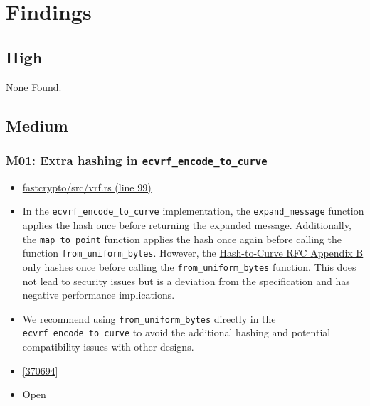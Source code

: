\section{Findings}
\subsection{High}
    None Found.
\subsection{Medium}

\subsubsection*{M01: Extra hashing in \lstinline{ecvrf_encode_to_curve}}
\begin{itemize}[align=left]
    \item[\textbf{Affected Code:}] \href{https://github.com/MystenLabs/fastcrypto/blob/963205c6d0538fe548b8b10037cf87a53af6f424/fastcrypto/src/vrf.rs#L99}{fastcrypto/src/vrf.rs (line 99)}
    \item[\textbf{Summary:}] In the \lstinline{ecvrf_encode_to_curve} implementation, the \lstinline{expand_message} function applies the hash once before returning the expanded message. Additionally, the \lstinline{map_to_point} function applies the hash once again before calling the function \lstinline{from_uniform_bytes}. However, the \href{https://datatracker.ietf.org/doc/html/draft-irtf-cfrg-hash-to-curve-16#name-hashing-to-ristretto255}{Hash-to-Curve RFC Appendix B} only hashes once before calling the \lstinline{from_uniform_bytes} function. This does not lead to security issues but is a deviation from the specification and has negative performance implications.
    \item[\textbf{Suggestion:}] We recommend using \lstinline{from_uniform_bytes} directly in the \lstinline{ecvrf_encode_to_curve} to avoid the additional hashing and potential compatibility issues with other designs.
    \item[\textbf{Suggested Fix:}] \href{https://github.com/MystenLabs/fastcrypto/pull/543/commits/370694eeffed74a57c816758d472640e4011ae7e}{[370694]}
    \item[\textbf{Status:}] Open
\end{itemize}

